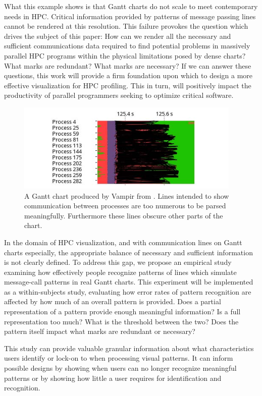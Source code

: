 What this example shows is that Gantt charts do not scale to meet contemporary needs in HPC. Critical information provided by patterns of message passing lines cannot be rendered at this resolution. This failure provokes the question which drives the subject of this paper: How can we render all the necessary and sufficient communications data required to find potential problems in massively parallel HPC programs within the physical limitations posed by dense charts? What marks are redundant? What marks are necessary? If we can answer these questions, this work will provide a firm foundation upon which to design a more effective visualization for HPC profiling. This in turn, will positively impact the productivity of parallel programmers seeking to optimize critical software.

\begin{figure}[h]
    \centering
    \includegraphics[width=.53\textwidth]{figs/bad_gantt.png}
    \caption{A Gantt chart produced by Vampir from \cite{Brendel2016}. Lines intended to show communication between processes are too numerous to be parsed meaningfully. Furthermore these lines obscure other parts of the chart.}
    \label{fig:bad_gantt}
\end{figure}

In the domain of HPC visualization, and with communication lines on Gantt charts especially, the appropriate balance of necessary and sufficient information is not clearly defined. To address this gap, we propose an empirical study examining how effectively people recognize patterns of lines which simulate message-call patterns in real Gantt charts. This experiment will be implemented as a within-subjects study, evaluating how error rates of pattern recognition are affected by how much of an overall pattern is provided. Does a partial representation of a pattern provide enough meaningful information? Is a full representation too much? What is the threshold between the two? Does the pattern itself impact what marks are redundant or necessary?

This study can provide valuable granular information about what characteristics users identify or lock-on to when processing visual patterns. It can inform possible designs by showing when users can no longer recognize meaningful patterns or by showing how little a user requires for identification and recognition. 

